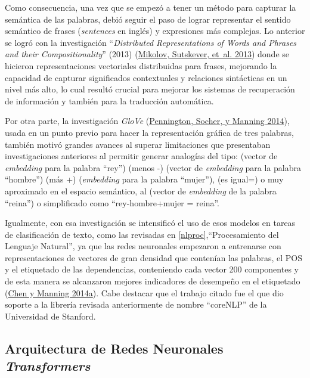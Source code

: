 \documentclass[
  12pt,
  openany]{book}
\begin{document}
Como consecuencia, una vez que se empezó a tener un método para capturar la semántica de las palabras, debió seguir el paso de lograr representar el sentido semántico de frases (\emph{sentences} en inglés) y expresiones más complejas. Lo anterior se logró con la investigación ``\emph{Distributed Representations of Words and Phrases and their Compositionality}'' (2013) (\protect\hyperlink{ref-mikolov2013a}{Mikolov, Sutskever, et~al. 2013}) donde se hicieron representaciones vectoriales distribuidas para frases, mejorando la capacidad de capturar significados contextuales y relaciones sintácticas en un nivel más alto, lo cual resultó crucial para mejorar los sistemas de recuperación de información y también para la traducción automática.

Por otra parte, la investigación \emph{GloVe} (\protect\hyperlink{ref-pennington2014}{Pennington, Socher, y Manning 2014}), usada en un punto previo para hacer la representación gráfica de tres palabras, también motivó grandes avances al superar limitaciones que presentaban investigaciones anteriores al permitir generar analogías del tipo: (vector de \emph{embedding} para la palabra ``rey'') (menos -) (vector de \emph{embedding} para la palabra ``hombre'') (más +) (\emph{embedding} para la palabra ``mujer''), (es igual=) o muy aproximado en el espacio semántico, al (vector de \emph{embedding} de la palabra ``reina'') o simplificado como ``rey-hombre+mujer = reina''.

Igualmente, con esa investigación se intensificó el uso de esos modelos en tareas de clasificación de texto, como las revisadas en \ref{nlproc},``Procesamiento del Lenguaje Natural'', ya que las redes neuronales empezaron a entrenarse con representaciones de vectores de gran densidad que contenían las palabras, el POS y el etiquetado de las dependencias, conteniendo cada vector 200 componentes y de esta manera se alcanzaron mejores indicadores de desempeño en el etiquetado (\protect\hyperlink{ref-chen2014}{Chen y Manning 2014a}). Cabe destacar que el trabajo citado fue el que dio soporte a la librería revisada anteriormente de nombre ``coreNLP'' de la Universidad de Stanford.

\hypertarget{trans}{%
\subsection{\texorpdfstring{Arquitectura de Redes Neuronales \emph{Transformers}}{Arquitectura de Redes Neuronales Transformers}}\label{trans}}
\end{document}
